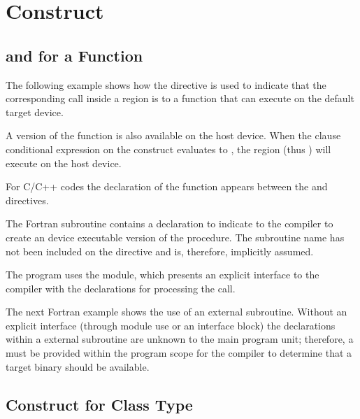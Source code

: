 \pagebreak
\chapter{  Construct}
\label{chap:declare_target}

\section{  and    for a Function}

The following example shows how the   directive 
is used to indicate that the corresponding call inside a  region 
is to a  function that can execute on the default target device.

A version of the function is also available on the host device. When the  
clause conditional expression on the  construct evaluates to , 
the  region (thus ) will execute on the host device.

For C/C++ codes the declaration of the function  appears between the  
 and    directives.


The Fortran  subroutine contains a   declaration 
to indicate to the compiler to create an device executable version of the procedure. 
The subroutine name has not been included on the   
directive and is, therefore, implicitly assumed.

The program uses the  module, which presents an explicit interface to 
the compiler with the   declarations for processing 
the  call.


The next Fortran example shows the use of an external subroutine. Without an explicit 
interface (through module use or an interface block) the   
declarations within a external subroutine are unknown to the main program unit; 
therefore, a   must be provided within the program 
scope for the compiler to determine that a target binary should be available.


\section{  Construct for Class Type}

